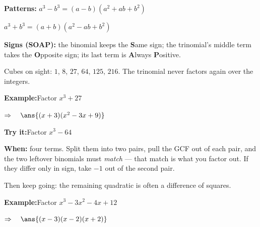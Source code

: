\documentclass[12pt]{article}
\begin{document}


\begin{formulabox}
\textbf{Patterns:} $a^3 - b^3 = (a-b)(a^2+ab+b^2)$\par
\hspace*{4.05em} $a^3 + b^3 = (a+b)(a^2-ab+b^2)$\par
\textbf{Signs (SOAP):} the binomial keeps the \textbf{S}ame sign; the trinomial's
middle term takes the \textbf{O}pposite sign; its last term is
\textbf{A}lways \textbf{P}ositive.\par
Cubes on sight: $1$, $8$, $27$, $64$, $125$, $216$.
The trinomial never factors again over the integers.
\end{formulabox}

\begin{examplebox}
\textbf{Example:}\quad Factor $x^3 + 27$

$\Rightarrow\quad \ans{(x+3)(x^2-3x+9)}$

\end{examplebox}

\begin{tryitbox}
\textbf{Try it:}\quad Factor $x^3 - 64$\\[2pt]
\end{tryitbox}


\begin{formulabox}
\textbf{When:} four terms. Split them into two pairs, pull the GCF out of each pair,
and the two leftover binomials must \emph{match} --- that match is what you factor
out. If they differ only in sign, take $-1$ out of the second pair.\par
Then keep going: the remaining quadratic is often a difference of squares.
\end{formulabox}

\begin{examplebox}
\textbf{Example:}\quad Factor $x^3 - 3x^2 - 4x + 12$

$\Rightarrow\quad \ans{(x-3)(x-2)(x+2)}$

\end{examplebox}
\end{document}
